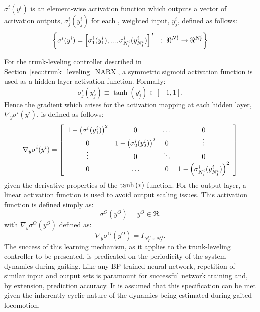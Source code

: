 		$\sigma^{i}(y^{i})$ is an element-wise activation function which outputs a vector of activation outputs, $\sigma_{j}^{i}(y_{j}^{i}) $ for each \Jth, weighted input, $y_{j}^{i}$, defined as follows:
			\begin{equation}
				\left\{ \sigma^{i}(y^{i}) = \left[ \sigma_{1}^{i}(y_{1}^{i}),...,\sigma_{N_{I}^{i}}^{i}(y_{N_{I}^{i}}^{i}) \right]^{T} \text{ } : \text{ } \Re^{N_{I}^{i}} \rightarrow \Re^{N_{I}^{i}}\right\}
			\end{equation}


		For the trunk-leveling controller described in Section~\ref{sec::trunk_leveling_NARX}, a symmetric sigmoid activation function is used as a hidden-layer activation function. Formally:
			\begin{equation}
				\sigma_{j}^{i}(y_{j}^{i}) \equiv \tanh(y_{j}^{i}) \in [-1,1]. 
				\label{eq::activation_function}
			\end{equation}
		Hence the gradient which arises for the activation mapping at each hidden layer, $\nabla_{y} \sigma^{i}(y^{i})$, is defined as follows: 
			\newcommand{\acti}[1]{1 - \wrap{\sigma^{i}_{#1}(y^{i}_{#1})}^{2}}
			\begin{equation}
				\nabla_{y} \sigma^{i}(y^{i})  =
				\left[
				\begin{array}{cccc}
					\acti{1} 	&	0		&	\ldots 		&	0 			\\	
					0			&	\acti{2}&	0			& 	\vdots 		\\
					\vdots 		&	0		& 	\ddots 		& 	0			\\
						0			&	\ldots	&	0			& 	\acti{N_{I}^{i}}
				\end{array}
				\right]
				\label{eq::bp_sigmoid_deriv}
			\end{equation} 
		given the derivative properties of the $\tanh\left(*\right)$ function. For the output layer, a linear activation function is used to avoid output scaling issues. This activation function is defined simply as:
			\begin{equation}
				\sigma^{O}(y^{O}) = y^{O} \in \Re. 
				\label{eq::output_activation_function}
			\end{equation}
		with $\nabla_{y}\sigma^{O}(y^{O})$ defined as:
			\begin{equation}
				\nabla_{y}\sigma^{O}(y^{O}) = I_{N_{I}^{O}\times N_{I}^{O}} . 
				\label{eq::bp_linear_deriv}
			\end{equation}		
		The success of this learning mechanism, as it applies to the trunk-leveling controller to be presented, is predicated on the periodicity of the system dynamics during gaiting. Like any BP-trained neural network, repetition of similar input and output sets is paramount for successful network training and, by extension, prediction accuracy. It is assumed that this specification can be met given the inherently cyclic nature of the dynamics being estimated during gaited locomotion. 







